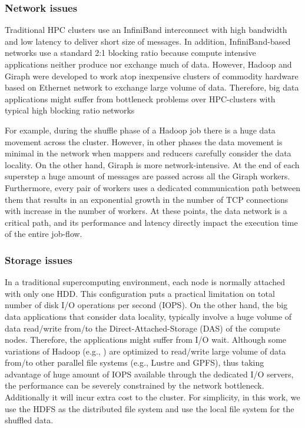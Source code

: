 \documentclass[conference]{IEEEtran}
\begin{document}
\subsubsection {Network issues}
Traditional HPC clusters use an InfiniBand interconnect with high bandwidth and low latency to deliver short size of messages. In addition, InfiniBand-based networks use a standard 2:1 blocking ratio because compute intensive applications neither produce nor exchange much of data. However, Hadoop and Giraph were developed to work atop inexpensive clusters of commodity hardware based on Ethernet network to exchange large volume of data. Therefore, big data applications might suffer from bottleneck problems over HPC-clusters with typical high blocking ratio networks

For example, during the shuffle phase of a Hadoop job there is a huge data movement across the cluster. However, in other phases the data movement is minimal in the network when mappers and reducers carefully consider the data locality. On the other hand, Giraph is more network-intensive. At the end of each superstep a huge amount of messages are passed across all the Giraph workers. Furthermore, every pair of workers uses a dedicated communication path between them that results in an exponential growth in the number of TCP connections with increase in the number of workers. At these points, the data network is a critical path, and its performance and latency directly impact the execution time of the entire job-flow.
\subsubsection {Storage issues}
In a traditional supercomputing environment, each node is normally attached with only one HDD. This configuration puts a practical limitation on total number of disk I/O operations per second (IOPS). On the other hand, the big data applications that consider data locality, typically involve a huge volume of data read/write from/to the Direct-Attached-Storage (DAS) of the compute nodes. Therefore, the applications might suffer from I/O wait. Although some variations of Hadoop (e.g., \cite{fw:myhadoop}) are optimized to read/write large volume of data from/to other parallel file systems (e.g., Lustre and GPFS), thus taking advantage of huge amount of IOPS available through the dedicated I/O servers, the performance can be severely constrained by the network bottleneck. Additionally it will incur extra cost to the cluster. For simplicity, in this work, we use the HDFS as the distributed file system and use the local file system for the shuffled data.
\end{document}
